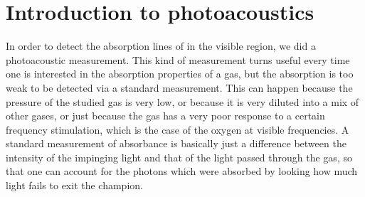 \chapter*{Introduction to photoacoustics}

In order to detect the absorption lines of  in the visible region, we did a photoacoustic measurement. This kind of measurement turns useful every time one is interested in the absorption properties of a gas, but the absorption is too weak to be detected via a standard measurement. This can happen because the pressure of the studied gas is very low, or because it is very diluted into a mix of other gases, or just because the gas has a very poor response to a certain frequency stimulation, which is the case of the oxygen at visible frequencies. A standard measurement of absorbance is basically just a difference between the intensity of the impinging light and that of the light passed through the gas, so that one can account for the photons which were absorbed by looking how much light fails to exit the champion.

